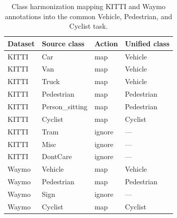 \begin{table}[t]
    \centering
    \caption{Class harmonization mapping KITTI and Waymo annotations into the common Vehicle, Pedestrian, and Cyclist task.}
    \label{tab:class_mapping}
    \begin{tabular}{llll}
        \toprule
        Dataset & Source class & Action & Unified class \\
        \midrule
        KITTI & Car & map & Vehicle \\
        KITTI & Van & map & Vehicle \\
        KITTI & Truck & map & Vehicle \\
        KITTI & Pedestrian & map & Pedestrian \\
        KITTI & Person\_sitting & map & Pedestrian \\
        KITTI & Cyclist & map & Cyclist \\
        KITTI & Tram & ignore & --- \\
        KITTI & Misc & ignore & --- \\
        KITTI & DontCare & ignore & --- \\
        Waymo & Vehicle & map & Vehicle \\
        Waymo & Pedestrian & map & Pedestrian \\
        Waymo & Sign & ignore & --- \\
        Waymo & Cyclist & map & Cyclist \\
        \bottomrule
    \end{tabular}
\end{table}
